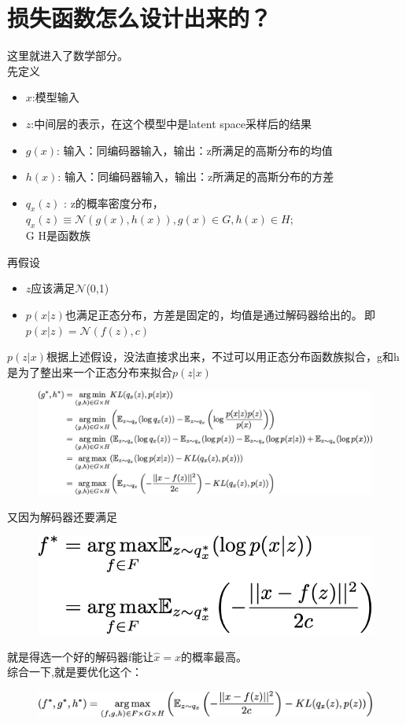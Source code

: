 \documentclass[]{report}
\begin{document}
\section{损失函数怎么设计出来的？}
这里就进入了数学部分。\\
先定义
\begin{itemize}
	\item $x$:模型输入
	\item $z$:中间层的表示，在这个模型中是latent space采样后的结果
	\item $g(x)$: 输入：同编码器输入，输出：z所满足的高斯分布的均值
	\item $h(x)$: 输入：同编码器输入，输出：z所满足的高斯分布的方差
	\item $q_x(z)$ :  z的概率密度分布，$q_x(z) \equiv  \mathcal{N}(g(x),h(x)),g(x)\in G,h(x)\in  H;$\\ G H是函数族
\end{itemize}
再假设
\begin{itemize}
	\item $z$应该满足$\mathcal{N}$(0,1)
	\item $p(x|z)$也满足正态分布，方差是固定的，均值是通过解码器给出的。\,即$p(x|z)=\mathcal{N}(f(z),c)$
\end{itemize}
\newpage
$p(z|x)$根据上述假设，没法直接求出来，不过可以用正态分布函数族拟合，g和h是为了整出来一个正态分布来拟合$p(z|x)$
\begin{figure}[h]
	\centering
	\includegraphics[width=0.9\linewidth]{images/screenshot014}
	\label{fig:screenshot014}
\end{figure}
\FloatBarrier
又因为解码器还要满足
\begin{figure}[h]
	\centering
	\includegraphics[width=0.4\linewidth]{images/screenshot015}
	\label{fig:screenshot015}
\end{figure}
就是得选一个好的解码器f能让$\hat{x}=x$的概率最高。\\
综合一下,就是要优化这个：\begin{figure}[h]
	\centering
	\includegraphics[width=0.8\linewidth]{images/screenshot016}
	\label{fig:screenshot016}
\end{figure}
\end{document}
